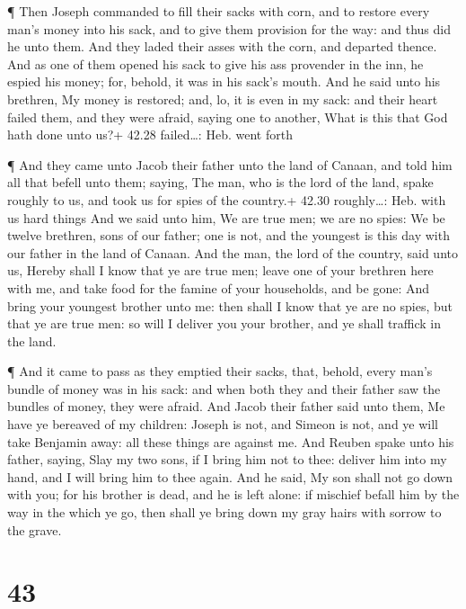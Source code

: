  ¶ Then Joseph commanded to fill their sacks with corn, and
to restore every man's money into his sack, and to give them provision
for the way: and thus did he unto them.  And they laded
their asses with the corn, and departed thence.  And as one
of them opened his sack to give his ass provender in the inn, he espied
his money; for, behold, it was in his sack's mouth.  And he
said unto his brethren, My money is restored; and, lo, it is even in my
sack: and their heart failed them, and they were afraid, saying one to
another, What is this that God hath done unto us?+ 42.28 failed\ldots:
Heb. went forth

 ¶ And they came unto Jacob their father unto the land of
Canaan, and told him all that befell unto them; saying, 
The man, who is the lord of the land, spake roughly to us, and took us
for spies of the country.+ 42.30 roughly\ldots: Heb. with us hard things
 And we said unto him, We are true men; we are no spies:
 We be twelve brethren, sons of our father; one is not, and
the youngest is this day with our father in the land of Canaan.
 And the man, the lord of the country, said unto us, Hereby
shall I know that ye are true men; leave one of your brethren here with
me, and take food for the famine of your households, and be gone:
 And bring your youngest brother unto me: then shall I know
that ye are no spies, but that ye are true men: so will I deliver you
your brother, and ye shall traffick in the land.

 ¶ And it came to pass as they emptied their sacks, that,
behold, every man's bundle of money was in his sack: and when both they
and their father saw the bundles of money, they were afraid.
 And Jacob their father said unto them, Me have ye bereaved
of my children: Joseph is not, and Simeon is not, and ye will take
Benjamin away: all these things are against me.  And Reuben
spake unto his father, saying, Slay my two sons, if I bring him not to
thee: deliver him into my hand, and I will bring him to thee again.
 And he said, My son shall not go down with you; for his
brother is dead, and he is left alone: if mischief befall him by the way
in the which ye go, then shall ye bring down my gray hairs with sorrow
to the grave.

\hypertarget{section-42}{%
\section{43}\label{section-42}}

